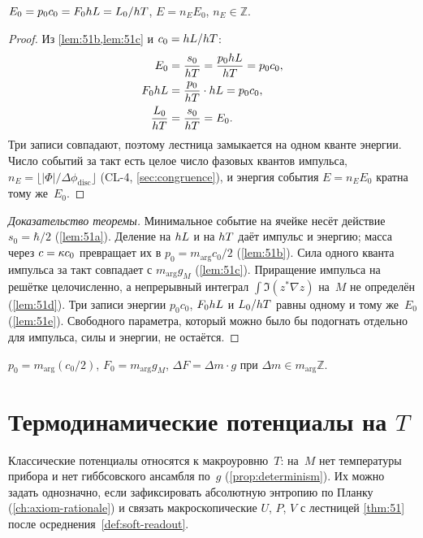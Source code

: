 \begin{lemma}[5.1e]
\label{lem:51e}
$E_0=p_0 c_0=F_0hL=L_0/hT$, $E=n_E E_0$, $n_E\in\mathbb{Z}$.
\end{lemma}

\begin{proof}
Из \cref{lem:51b,lem:51c} и $c_0=hL/hT$:
\begin{align*}
  E_0&=\frac{s_0}{hT}=\frac{p_0hL}{hT}=p_0 c_0,\\
  F_0hL&=\frac{p_0}{hT}\cdot hL=p_0 c_0,\\
  \frac{L_0}{hT}&=\frac{s_0}{hT}=E_0.
\end{align*}
Три записи совпадают, поэтому лестница замыкается на одном кванте энергии.
Число событий за такт есть целое число фазовых квантов импульса,
$n_E=\lfloor|\Phi|/\Delta\phi_{\mathrm{disc}}\rfloor$ (CL-4, \cref{sec:congruence}),
и энергия события $E=n_E E_0$ кратна тому же~$E_0$.
\end{proof}

\begin{proof}[Доказательство теоремы]
Минимальное событие на ячейке несёт действие $s_0=\hbar/2$ (\cref{lem:51a}).
Деление на $hL$ и на $hT$ даёт импульс и энергию;
масса через $c=\kappa c_0$ превращает их в $p_0=m_{\arg} c_0/2$ (\cref{lem:51b}).
Сила одного кванта импульса за такт совпадает с $m_{\arg} g_M$ (\cref{lem:51c}).
Приращение импульса на решётке целочисленно, а непрерывный интеграл $\int\Im(z^*\nabla z)$ на~$M$ не определён (\cref{lem:51d}).
Три записи энергии $p_0 c_0$, $F_0hL$ и $L_0/hT$ равны одному и тому же~$E_0$ (\cref{lem:51e}).
Свободного параметра, который можно было бы подогнать отдельно для импульса, силы и энергии, не остаётся.
\end{proof}

\begin{corollary}
$p_0=m_{\arg}(c_0/2)$, $F_0=m_{\arg} g_M$, $\Delta F=\Delta m\cdot g$ при $\Delta m\in m_{\arg}\mathbb{Z}$.
\end{corollary}

\section{Термодинамические потенциалы на \texorpdfstring{$T$}{T}}
\label{sec:thermo-potentials}

Классические потенциалы относятся к макроуровню~$T$: на~$M$ нет температуры прибора
и нет гиббсовского ансамбля по~$g$ (\cref{prop:determinism}).
Их можно задать однозначно, если зафиксировать абсолютную энтропию по Планку
(\cref{ch:axiom-rationale}) и связать макроскопические $U$, $P$, $V$ с лестницей
\cref{thm:51} после осреднения~\cref{def:soft-readout}.

